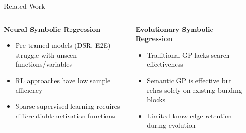\documentclass[aspectratio=1610]{beamer}
\begin{document}
    \begin{frame}{Related Work}
        \begin{columns}
            \begin{column}{0.48\textwidth}
                \textbf{Neural Symbolic Regression}
                \begin{itemize}
                    \item Pre-trained models (DSR, E2E) struggle with unseen functions/variables
                    \item RL approaches have low sample efficiency
                    \item Sparse supervised learning requires differentiable activation functions
                \end{itemize}
            \end{column}
            \begin{column}{0.48\textwidth}
                \textbf{Evolutionary Symbolic Regression}
                \begin{itemize}
                    \item Traditional GP lacks search effectiveness
                    \item Semantic GP is effective but relies solely on existing building blocks
                    \item Limited knowledge retention during evolution
                \end{itemize}
            \end{column}
        \end{columns}
    \end{frame}
\end{document}
